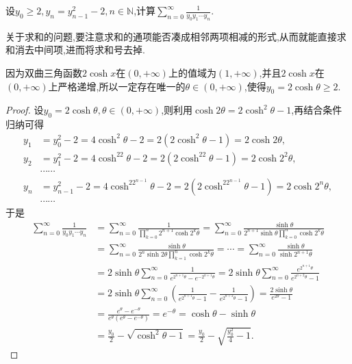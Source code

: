 \documentclass[../../main.tex]{subfiles}%
\begin{document}
\begin{example}\label{example:三角换元求通项例题11111}
设\(y_0\geqslant 2,y_n=y_{n - 1}^{2}-2,n\in\mathbb{N}\),计算\(\sum_{n = 0}^{\infty}\frac{1}{y_0y_1\cdots y_n}\).
\end{example}
\begin{note}
关于求和的问题,要注意求和的通项能否凑成相邻两项相减的形式,从而就能直接求和消去中间项,进而将求和号去掉.
\end{note}
\begin{remark}
因为双曲三角函数\(2\cosh x\)在\((0, +\infty)\)上的值域为\((1, +\infty)\),并且\(2\cosh x\)在\((0, +\infty)\)上严格递增,所以一定存在唯一的\(\theta \in (0, +\infty)\),使得\(y_0 = 2\cosh\theta \geqslant  2\).
\end{remark}
\begin{proof}

设\(y_0 = 2\cosh\theta, \theta \in (0, +\infty)\),则利用\(\cosh 2\theta = 2\cosh^2\theta - 1\),再结合条件归纳可得
\begin{align*}
y_1&=y_{0}^{2}-2 = 4\cosh^2\theta - 2 = 2(2\cosh^2\theta - 1) = 2\cosh 2\theta,\\
y_2&=y_{1}^{2}-2 = 4\cosh^22\theta - 2 = 2(2\cosh^22\theta - 1) = 2\cosh 2^2\theta,\\
&\cdots\cdots\\
y_n&=y_{n - 1}^{2}-2 = 4\cosh^22^{n - 1}\theta - 2 = 2(2\cosh^22^{n - 1}\theta - 1) = 2\cosh 2^n\theta,\\
&\cdots\cdots
\end{align*}
于是
\begin{align*}
\sum_{n=0}^{\infty}{\frac{1}{y_0y_1\cdots y_n}}&=\sum_{n=0}^{\infty}{\frac{1}{\prod\limits_{k=0}^n{2^{n+1}\cosh 2^k\theta}}}=\sum_{n=0}^{\infty}{\frac{\sinh \theta}{2^{n+1}\sinh \theta \prod\limits_{k=0}^n{\cosh 2^k\theta}}}
\\
&=\sum_{n=0}^{\infty}{\frac{\sinh \theta}{2^n\sinh 2\theta \prod\limits_{k=1}^n{\cosh 2^k\theta}}}=\cdots =\sum_{n=0}^{\infty}{\frac{\sinh \theta}{\sinh 2^{n+1}\theta}}
\\
&=2\sinh \theta \sum_{n=0}^{\infty}{\frac{1}{e^{2^{n+1}\theta}-e^{-2^{n+1}\theta}}}=2\sinh \theta \sum_{n=0}^{\infty}{\frac{e^{2^{n+1}\theta}}{e^{2^{n+2}\theta}-1}}
\\
&=2\sinh \theta \sum_{n=0}^{\infty}{\left( \frac{1}{e^{2^{n+1}\theta}-1}-\frac{1}{e^{2^{n+2}\theta}-1} \right)}=\frac{2\sinh \theta}{e^{2\theta}-1}
\\
&=\frac{e^{\theta}-e^{-\theta}}{e^{\theta}\left( e^{\theta}-e^{-\theta} \right)}=e^{-\theta}=\cosh \theta -\sinh \theta 
\\
&=\frac{y_0}{2}-\sqrt{\cosh ^2\theta -1}=\frac{y_0}{2}-\sqrt{\frac{y_{0}^{2}}{4}-1}.
\end{align*}

\end{proof}
\end{document}
